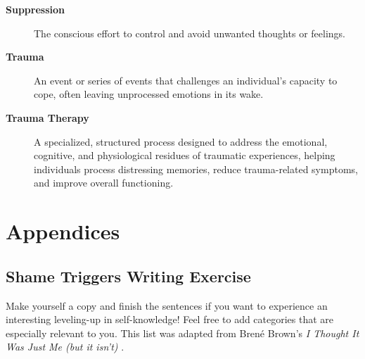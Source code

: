 \documentclass[12pt,letterpaper]{article}
\begin{document}
\begin{description}
    \item[\textbf{Suppression}] The conscious effort to control and avoid unwanted thoughts or feelings.
    \item[\textbf{Trauma}] An event or series of events that challenges an individual's capacity to cope, often leaving unprocessed emotions in its wake.
    \item[\textbf{Trauma Therapy}] A specialized, structured process designed to address the emotional, cognitive, and physiological residues of traumatic experiences, helping individuals process distressing memories, reduce trauma-related symptoms, and improve overall functioning.
\end{description}
\appendix
\section{Appendices}
\subsection{Shame Triggers Writing Exercise}
\label{sec:shametriggers}
Make yourself a copy and finish the sentences if you want to experience an interesting leveling-up in self-knowledge! Feel free to add categories that are especially relevant to you. This list was adapted from Brené Brown's \textit{I Thought It Was Just Me (but it isn't)} \cite{brownThought}.
\end{document}
